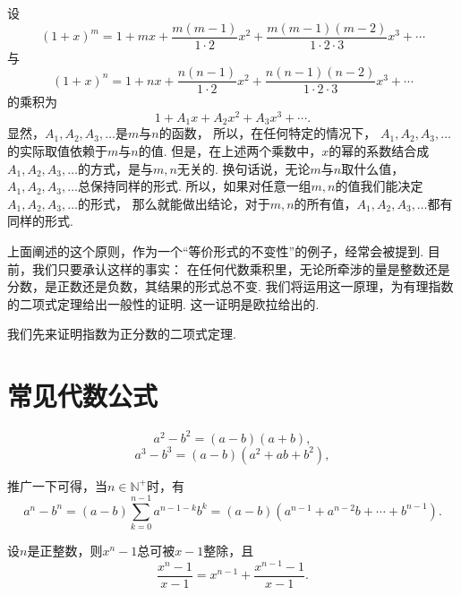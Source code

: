 设\begin{equation*}
	(1+x)^m
	= 1 + mx + \frac{m(m-1)}{1\cdot2}x^2
	+ \frac{m(m-1)(m-2)}{1\cdot2\cdot3}x^3
	+ \dotsb
\end{equation*}与\begin{equation*}
	(1+x)^n
	= 1 + nx + \frac{n(n-1)}{1\cdot2}x^2
	+ \frac{n(n-1)(n-2)}{1\cdot2\cdot3}x^3
	+ \dotsb
\end{equation*}的乘积为\begin{equation*}
	1 + A_1 x + A_2 x^2 + A_3 x^3 + \dotsb.
\end{equation*}
显然，\(A_1,A_2,A_3,\dotsc\)是\(m\)与\(n\)的函数，
所以，在任何特定的情况下，
\(A_1,A_2,A_3,\dotsc\)的实际取值依赖于\(m\)与\(n\)的值.
但是，在上述两个乘数中，\(x\)的幂的系数结合成\(A_1,A_2,A_3,\dotsc\)的方式，是与\(m,n\)无关的.
换句话说，无论\(m\)与\(n\)取什么值，\(A_1,A_2,A_3,\dotsc\)总保持同样的形式.
所以，如果对任意一组\(m,n\)的值我们能决定\(A_1,A_2,A_3,\dotsc\)的形式，
那么就能做出结论，对于\(m,n\)的所有值，\(A_1,A_2,A_3,\dotsc\)都有同样的形式.

上面阐述的这个原则，作为一个“等价形式的不变性”的例子，经常会被提到.
目前，我们只要承认这样的事实：
在任何代数乘积里，无论所牵涉的量是整数还是分数，是正数还是负数，其结果的形式总不变.
我们将运用这一原理，为有理指数的二项式定理给出一般性的证明.
这一证明是欧拉给出的.

我们先来证明指数为正分数的二项式定理.

\section{常见代数公式}

\begin{theorem}
\begin{equation*}
a^2 - b^2 = (a-b)(a+b),
\end{equation*}\begin{equation*}
a^3 - b^3 = (a-b)(a^2+ab+b^2),
\end{equation*}

推广一下可得，当\(n \in \mathbb{N}^+\)时，有\begin{equation*}
a^n - b^n = (a-b) \sum_{k=0}^{n-1}{a^{n-1-k} b^k}
= (a-b)(a^{n-1} + a^{n-2} b + \dotsb + b^{n-1}).
\end{equation*}
\end{theorem}

设\(n\)是正整数，则\(x^n-1\)总可被\(x-1\)整除，且\begin{equation*}
	\frac{x^n-1}{x-1}
	= x^{n-1} + \frac{x^{n-1}-1}{x-1}.
\end{equation*}


